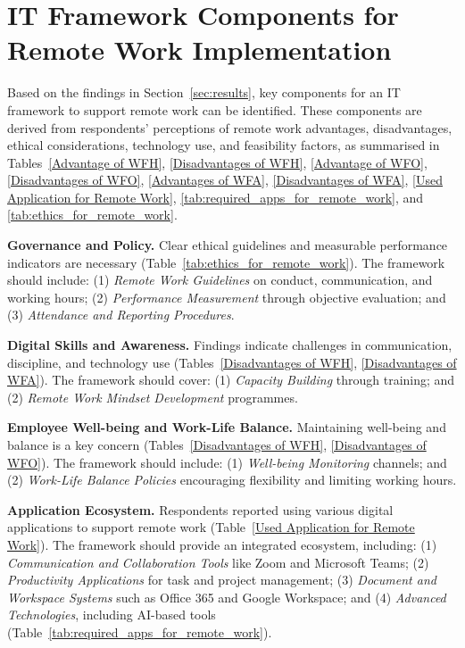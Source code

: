 \documentclass{infotel}
\begin{document}
\section{IT Framework Components for Remote Work Implementation}
\label{sec:it-framework}


Based on the findings in Section~\ref{sec:results}, key components for an IT framework to support remote work can be identified. These components are derived from respondents’ perceptions of remote work advantages, disadvantages, ethical considerations, technology use, and feasibility factors, as summarised in Tables~\ref{Advantage of WFH}, \ref{Disadvantages of WFH}, \ref{Advantage of WFO}, \ref{Disadvantages of WFO}, \ref{Advantages of WFA}, \ref{Disadvantages of WFA}, \ref{Used Application for Remote Work}, \ref{tab:required_apps_for_remote_work}, and \ref{tab:ethics_for_remote_work}.

\textbf{Governance and Policy.}
Clear ethical guidelines and measurable performance indicators are necessary (Table~\ref{tab:ethics_for_remote_work}). The framework should include: (1) \textit{Remote Work Guidelines} on conduct, communication, and working hours; (2) \textit{Performance Measurement} through objective evaluation; and (3) \textit{Attendance and Reporting Procedures}.

\textbf{Digital Skills and Awareness.}
Findings indicate challenges in communication, discipline, and technology use (Tables~\ref{Disadvantages of WFH}, \ref{Disadvantages of WFA}). The framework should cover: (1) \textit{Capacity Building} through training; and (2) \textit{Remote Work Mindset Development} programmes.

\textbf{Employee Well-being and Work-Life Balance.}
Maintaining well-being and balance is a key concern (Tables~\ref{Disadvantages of WFH}, \ref{Disadvantages of WFO}). The framework should include: (1) \textit{Well-being Monitoring} channels; and (2) \textit{Work-Life Balance Policies} encouraging flexibility and limiting working hours.

\textbf{Application Ecosystem.}
Respondents reported using various digital applications to support remote work (Table~\ref{Used Application for Remote Work}). The framework should provide an integrated ecosystem, including: (1) \textit{Communication and Collaboration Tools} like Zoom and Microsoft Teams; (2) \textit{Productivity Applications} for task and project management; (3) \textit{Document and Workspace Systems} such as Office 365 and Google Workspace; and (4) \textit{Advanced Technologies}, including AI-based tools (Table~\ref{tab:required_apps_for_remote_work}).
\end{document}
